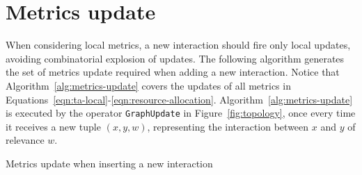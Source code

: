 \section{Metrics update}
\label{sec:metrics-update}

When considering local metrics, a new interaction should fire only local updates, avoiding combinatorial explosion of updates.
The following algorithm generates the set of metrics update required when adding a new interaction.
Notice that Algorithm~\ref{alg:metrics-update} covers the updates of all metrics in Equations~\ref{eqn:ta-local}-\ref{eqn:resource-allocation}. 
Algorithm~\ref{alg:metrics-update} is executed by the operator \texttt{GraphUpdate} in Figure~\ref{fig:topology}, once every time it receives a new tuple $(x,y,w)$, representing the interaction between $x$ and $y$ of relevance $w$.

\begin{algorithm}[h!]
  
  \vspace{1em}
  
   {
  	




  }
  
  \vspace{1em}
  
  \vspace{1em}
  \caption{Metrics update when inserting a new interaction}
  \label{alg:metrics-update}
\end{algorithm}

